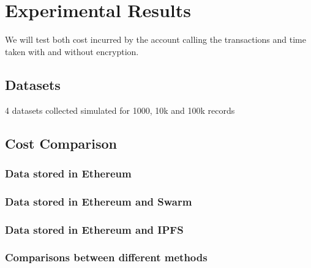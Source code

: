 \documentclass[11pt,openright]{report}
\begin{document}
%
%
%

\chapter{Experimental Results}
\label{chapter:experiment_results}
We will test both cost incurred by the account calling the transactions and time taken with and without encryption.

\section{Datasets}
4 datasets
collected
simulated for 1000, 10k and 100k records

\section{Cost Comparison}
\subsection{Data stored in Ethereum}
\subsection{Data stored in Ethereum and Swarm}
\subsection{Data stored in Ethereum and IPFS}
\subsection{Comparisons between different methods}
\end{document}
